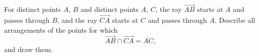 For distinct points $A$, $B$ and distinct points $A$, $C$, the ray $\overrightarrow{AB}$ starts at $A$ and passes through $B$, and the ray $\overrightarrow{CA}$ starts at $C$ and passes through $A$. Describe all arrangements of the points for which
\[
\overrightarrow{AB}\cap\overrightarrow{CA}=\overline{AC},
\]
and draw them.

